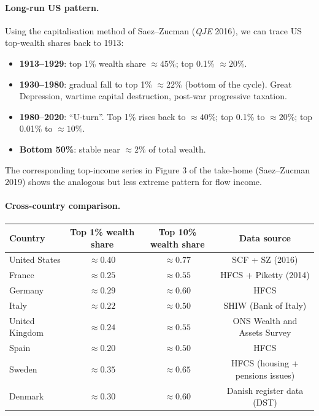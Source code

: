 \documentclass[11pt,a4paper]{article}
\begin{document}
\paragraph{Long-run US pattern.}
Using the capitalisation method of Saez--Zucman (\emph{QJE} 2016), we can trace US top-wealth shares back to 1913:
\begin{itemize}[leftmargin=*,itemsep=1pt]
    \item \textbf{1913--1929}: top 1\% wealth share $\approx 45\%$; top 0.1\% $\approx 20\%$.
    \item \textbf{1930--1980}: gradual fall to top 1\% $\approx 22\%$ (bottom of the cycle). Great Depression, wartime capital destruction, post-war progressive taxation.
    \item \textbf{1980--2020}: ``U-turn''. Top 1\% rises back to $\approx 40\%$; top 0.1\% to $\approx 20\%$; top 0.01\% to $\approx 10\%$.
    \item \textbf{Bottom 50\%}: stable near $\approx 2\%$ of total wealth.
\end{itemize}

The corresponding top-income series in Figure 3 of the take-home (Saez--Zucman 2019) shows the analogous but less extreme pattern for flow income.

\paragraph{Cross-country comparison.}

\begin{center}
\small
\begin{tabular}{lccc}
\toprule
Country & Top 1\% wealth share & Top 10\% wealth share & Data source \\
\midrule
United States  & $\approx 0.40$ & $\approx 0.77$ & SCF + SZ (2016) \\
France         & $\approx 0.25$ & $\approx 0.55$ & HFCS + Piketty (2014) \\
Germany        & $\approx 0.29$ & $\approx 0.60$ & HFCS \\
Italy          & $\approx 0.22$ & $\approx 0.50$ & SHIW (Bank of Italy) \\
United Kingdom & $\approx 0.24$ & $\approx 0.55$ & ONS Wealth and Assets Survey \\
Spain          & $\approx 0.20$ & $\approx 0.50$ & HFCS \\
Sweden         & $\approx 0.35$ & $\approx 0.65$ & HFCS (housing + pensions issues) \\
Denmark        & $\approx 0.30$ & $\approx 0.60$ & Danish register data (DST) \\
\bottomrule
\end{tabular}
\end{center}
\end{document}
